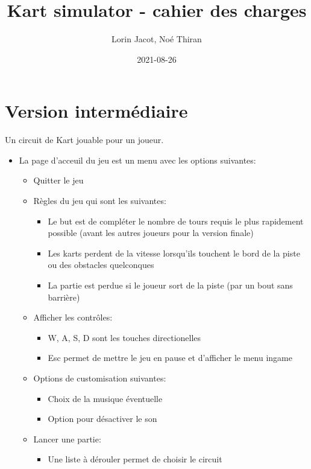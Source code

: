 \documentclass{article}
\title{Kart simulator - cahier des charges}
\date{2021-08-26}
\author{Lorin Jacot, Noé Thiran}
\begin{document}
\maketitle

\section{Version intermédiaire}

Un circuit de Kart jouable pour un joueur.
\begin{itemize}
    \item La page d'acceuil du jeu est un menu avec les options suivantes: \begin{itemize}
              \item Quitter le jeu
              \item Règles du jeu qui sont les suivantes: \begin{itemize}
                        \item Le but est de compléter le nombre de tours requis le plus rapidement possible (avant les autres joueurs pour la version finale)
                        \item Les karts perdent de la vitesse lorsqu'ils touchent le bord de la piste ou des obstacles quelconques
                        \item La partie est perdue si le joueur sort de la piste (par un bout sans barrière)
                    \end{itemize}
              \item Afficher les contrôles: \begin{itemize}
                        \item W, A, S, D sont les touches directionelles
                        \item Esc permet de mettre le jeu en pause et d'afficher le menu ingame
                    \end{itemize}
              \item Options de customisation suivantes: \begin{itemize}
                        \item Choix de la musique éventuelle
                        \item Option pour désactiver le son
                    \end{itemize}
              \item Lancer une partie: \begin{itemize}
                        \item Une liste à dérouler permet de choisir le circuit

\end{itemize}
\end{itemize}
\end{itemize}
\end{document}
